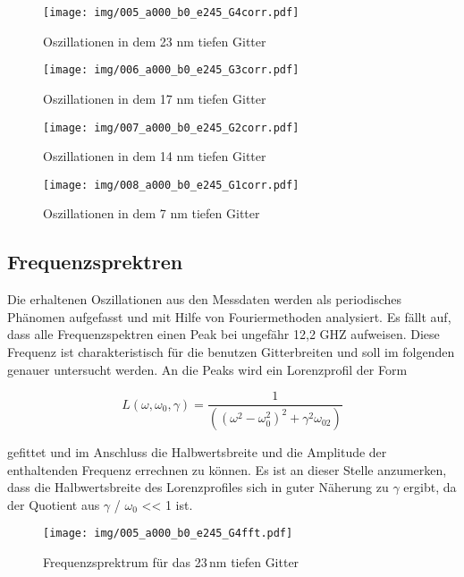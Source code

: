 \begin{figure}[!htbp]
 	\centering
 	\texttt{[image: img/005\_a000\_b0\_e245\_G4corr.pdf]}
 	\caption{Oszillationen in dem 23 nm tiefen Gitter}
 	\label{abb:film}
\end{figure}

\begin{figure}[!htbp]
 	\centering
 	\texttt{[image: img/006\_a000\_b0\_e245\_G3corr.pdf]}
 	\caption{Oszillationen in dem 17 nm tiefen Gitter}
 	\label{abb:film}
\end{figure}

\begin{figure}[!htbp]
 	\centering
 	\texttt{[image: img/007\_a000\_b0\_e245\_G2corr.pdf]}
 	\caption{Oszillationen in dem 14 nm tiefen Gitter}
 	\label{abb:film}
\end{figure}

\begin{figure}[!htbp]
 	\centering
 	\texttt{[image: img/008\_a000\_b0\_e245\_G1corr.pdf]}
 	\caption{Oszillationen in dem 7 nm tiefen Gitter}
 	\label{abb:film}
\end{figure}

\newpage

\subsection{Frequenzsprektren}
Die erhaltenen Oszillationen aus den Messdaten werden als periodisches Phänomen aufgefasst und mit Hilfe von Fouriermethoden analysiert. Es fällt auf, dass alle Frequenzspektren einen Peak bei ungefähr 12,2 GHZ aufweisen. Diese Frequenz ist charakteristisch für die benutzen Gitterbreiten und soll im folgenden genauer untersucht werden. An die Peaks wird ein Lorenzprofil der Form

\begin{equation}
L(\omega, \omega_0, \gamma) = \frac{1}{((\omega^2 - \omega_0^2)^2 + \gamma^2  \omega_02)}
\end{equation}

gefittet und im Anschluss die Halbwertsbreite und die Amplitude der enthaltenden Frequenz errechnen zu können. Es ist an dieser Stelle anzumerken, dass die Halbwertsbreite des Lorenzprofiles sich in guter Näherung zu $\gamma$ ergibt, da der Quotient aus $\gamma$ / $\omega_0$ << 1 ist.

\begin{figure}[!htbp]
 	\centering
 	\texttt{[image: img/005\_a000\_b0\_e245\_G4fft.pdf]}
 	\caption{Frequenzsprektrum für das 23\,nm tiefen Gitter}
 	\label{abb:film}
\end{figure}

